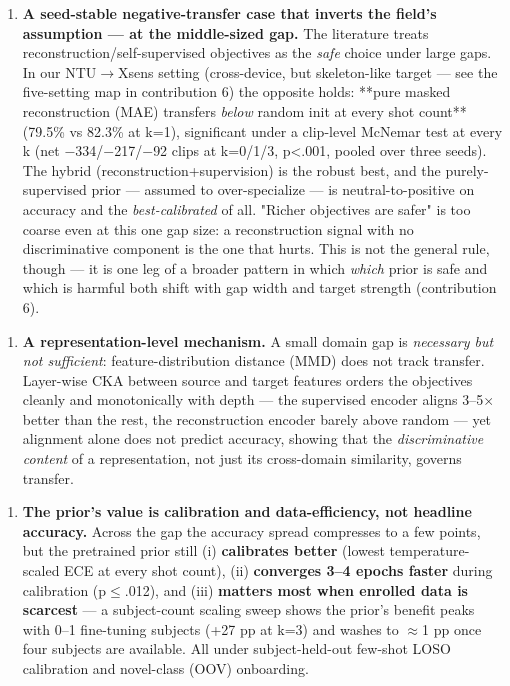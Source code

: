 \begin{enumerate}
  \item \textbf{A seed-stable negative-transfer case that inverts the field's assumption --- at the middle-sized gap.} The literature treats reconstruction/self-supervised objectives as the \textit{safe} choice under large gaps. In our NTU$\rightarrow$Xsens setting (cross-device, but skeleton-like target --- see the five-setting map in contribution 6) the opposite holds: **pure masked reconstruction (MAE) transfers \textit{below} random init at every shot count** (79.5\% vs 82.3\% at k=1), significant under a clip-level McNemar test at every k (net $-$334/$-$217/$-$92 clips at k=0/1/3, p<.001, pooled over three seeds). The hybrid (reconstruction+supervision) is the robust best, and the purely-supervised prior --- assumed to over-specialize --- is neutral-to-positive on accuracy and the \textit{best-calibrated} of all. "Richer objectives are safer" is too coarse even at this one gap size: a reconstruction signal with no discriminative component is the one that hurts. This is not the general rule, though --- it is one leg of a broader pattern in which \textit{which} prior is safe and which is harmful both shift with gap width and target strength (contribution 6).
\end{enumerate}

\begin{enumerate}
  \item \textbf{A representation-level mechanism.} A small domain gap is \textit{necessary but not sufficient}: feature-distribution distance (MMD) does not track transfer. Layer-wise CKA between source and target features orders the objectives cleanly and monotonically with depth --- the supervised encoder aligns 3--5$\times$ better than the rest, the reconstruction encoder barely above random --- yet alignment alone does not predict accuracy, showing that the \textit{discriminative content} of a representation, not just its cross-domain similarity, governs transfer.
\end{enumerate}

\begin{enumerate}
  \item \textbf{The prior's value is calibration and data-efficiency, not headline accuracy.} Across the gap the accuracy spread compresses to a few points, but the pretrained prior still (i) \textbf{calibrates better} (lowest temperature-scaled ECE at every shot count), (ii) \textbf{converges 3--4 epochs faster} during calibration (p$\le$.012), and (iii) \textbf{matters most when enrolled data is scarcest} --- a subject-count scaling sweep shows the prior's benefit peaks with 0--1 fine-tuning subjects (+27 pp at k=3) and washes to $\approx$1 pp once four subjects are available. All under subject-held-out few-shot LOSO calibration and novel-class (OOV) onboarding.
\end{enumerate}

